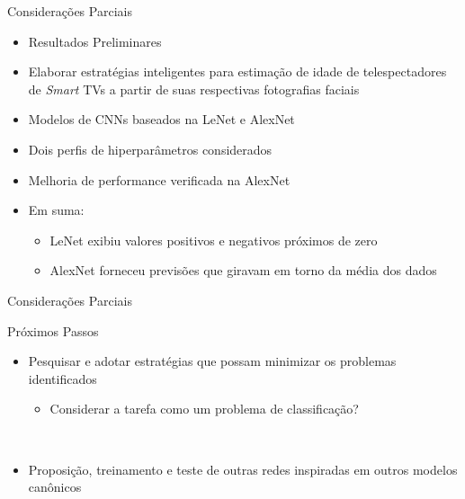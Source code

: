 \begin{frame}{Considerações Parciais}
	\begin{itemize}
		\item \alert{Resultados Preliminares}
		\item Elaborar estratégias inteligentes para estimação de idade de telespectadores de  \emph{Smart} TVs a partir de suas respectivas fotografias faciais\\
		\item Modelos de CNNs baseados na LeNet e AlexNet
		\item Dois perfis de hiperparâmetros considerados
		\item Melhoria de performance verificada na AlexNet
		\item Em suma:
		\begin{itemize}
			\item LeNet exibiu valores positivos e negativos próximos de zero
			\item AlexNet forneceu previsões que giravam em torno da média dos dados
		\end{itemize}
  \end{itemize}
\end{frame}

\begin{frame}{Considerações Parciais}
	\begin{block}{Próximos Passos}
		\begin{itemize}
			\item Pesquisar e adotar estratégias que possam minimizar os problemas identificados
			\begin{itemize}
				\item Considerar a tarefa como um problema de classificação?
			\end{itemize}
			\ \ \newline
			\item Proposição, treinamento e teste de outras redes inspiradas em outros modelos canônicos
		\end{itemize}
	\end{block}
\end{frame}
